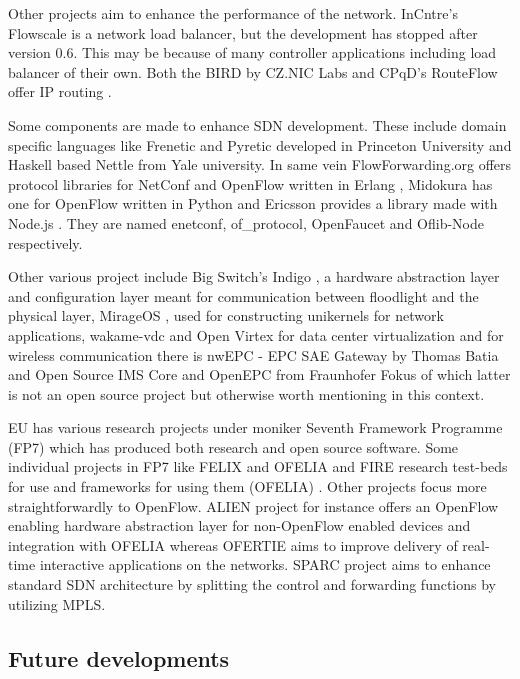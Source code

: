 \documentclass[english]{tktltiki2}
\theoremstyle{definition}
\theoremstyle{remark}
\begin{document}
Other projects aim to enhance the performance of the network. InCntre’s Flowscale \cite{Flowscale} is a network load balancer, but the development has stopped after version 0.6. This may be because of many controller applications including load balancer of their own. Both the BIRD by CZ.NIC Labs and CPqD’s RouteFlow offer IP routing \cite{Bird, RouteFlow}.

Some components are made to enhance SDN development. These include domain specific languages like Frenetic and Pyretic developed in Princeton University \cite{Frenetic} and Haskell based Nettle \cite{Nettle} from Yale university. In same vein FlowForwarding.org offers protocol libraries for NetConf and OpenFlow written in Erlang \cite{enetconf,ofproto}, Midokura has one for OpenFlow written in Python \cite{OpenFaucet} and Ericsson provides a library made with Node.js \cite{Node}. They are named enetconf, of\_protocol, OpenFaucet and Oflib-Node respectively. 

Other various project include Big Switch’s Indigo \cite{Indigo}, a hardware abstraction layer and configuration layer meant for communication between floodlight and the physical layer, MirageOS \cite{Mirage}, used for constructing unikernels for network applications, wakame-vdc and Open Virtex for data center virtualization \cite{wakame, Virtex} and for wireless communication there is nwEPC - EPC SAE Gateway by Thomas Batia \cite{nwEPC} and Open Source IMS Core and OpenEPC from Fraunhofer Fokus \cite{IMSCORE, OpenEPC} of which latter is not an open source project but otherwise worth mentioning in this context. 

EU has various research projects under moniker Seventh Framework Programme (FP7) \cite{FP7} which has produced both research and open source software. Some individual projects in FP7 like FELIX and OFELIA and FIRE research test-beds for use and frameworks for using them (OFELIA) \cite{FELIX, OFELIA, FIRE}. Other projects focus more straightforwardly to OpenFlow. ALIEN project \cite{ALIEN} for instance offers an OpenFlow enabling hardware abstraction layer for non-OpenFlow enabled devices and integration with OFELIA whereas OFERTIE \cite{OFERTIE} aims to improve delivery of real-time interactive applications on the networks. SPARC \cite{SPARC} project aims to enhance standard SDN architecture by splitting the control and forwarding functions by utilizing MPLS.

\subsection{Future developments}
\end{document}
